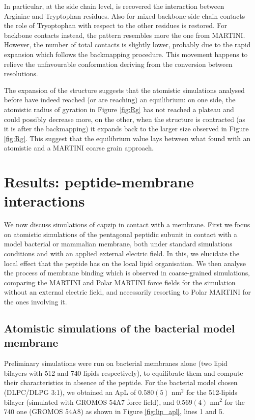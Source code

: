 %
In particular, at the side chain level, is recovered the interaction between Arginine and Tryptophan residues. Also for mixed backbone-side chain contacts the role of Tryoptophan with respect to the other residues is restored. For backbone contacts instead, the pattern resembles more the one from MARTINI. However, the number of total contacts is slightly lower, probably due to the rapid expansion which follows the backmapping procedure. This movement happens to relieve the unfavourable conformation deriving from the conversion between resolutions.

The expansion of the structure suggests that the atomistic simulations analysed before have indeed reached (or are reaching) an equilibrium: on one side, the atomistic radius of gyration in Figure \ref{fig:Rg} has not reached a plateau and could possibly decrease more, on the other, when the structure is contracted (as it is after the backmapping) it expands back to the larger size observed in Figure \ref{fig:Rg}. This suggest that the equilibrium value lays between what found with an atomistic and a MARTINI coarse grain approach.


\clearpage
\section{Results: peptide-membrane interactions}

We now discuss simulations of capzip in contact with a membrane. First we focus on atomistic simulations of the pentagonal peptidic subunit in contact with a model bacterial or mammalian membrane, both under standard simulations conditions and with an applied external electric field. In this, we elucidate the local effect that the peptide has on the local lipid organisation.
%
We then analyse the process of membrane binding which is observed in coarse-grained simulations, comparing the MARTINI and Polar MARTINI force fields for the simulation without an external electric field, and necessarily resorting to Polar MARTINI for the ones involving it. 


\subsection{Atomistic simulations of the bacterial model membrane} \label{sec:lip_atom_bact}

Preliminary simulations were run on bacterial membranes alone (two lipid bilayers with 512 and 740 lipids respectively), to equilibrate them and compute their characteristics in absence of the peptide.
%
For the bacterial model chosen (DLPC/DLPG 3:1), we obtained an ApL of $0.580(5)$ nm$^2$ for the 512-lipids bilayer (simulated with GROMOS 54A7 force field), and  $0.569(4)$ nm$^2$ for the 740 one (GROMOS 54A8) as shown in Figure \ref{fig:lip_apl}, lines 1 and 5.

